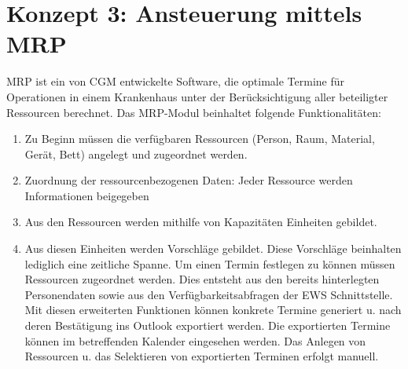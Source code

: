 \section{Konzept 3: Ansteuerung mittels MRP}
MRP ist ein von CGM entwickelte Software, die optimale Termine für Operationen in einem Krankenhaus unter der Berücksichtigung aller beteiligter Ressourcen berechnet. Das MRP-Modul beinhaltet folgende Funktionalitäten:\\
\begin{enumerate}
	\item Zu Beginn müssen die verfügbaren Ressourcen (Person, Raum, Material, Gerät, Bett) angelegt und zugeordnet werden.  
	\item Zuordnung der ressourcenbezogenen Daten: Jeder  Ressource werden Informationen beigegeben
	\item Aus den Ressourcen werden mithilfe von Kapazitäten Einheiten gebildet.
	\item Aus diesen Einheiten werden Vorschläge gebildet. Diese Vorschläge beinhalten lediglich eine zeitliche Spanne. Um einen Termin festlegen zu können müssen Ressourcen zugeordnet werden. Dies entsteht aus den bereits hinterlegten Personendaten sowie aus den Verfügbarkeitsabfragen der EWS Schnittstelle. Mit diesen erweiterten Funktionen können konkrete Termine generiert u. nach deren Bestätigung ins Outlook exportiert werden. Die exportierten Termine können im betreffenden Kalender eingesehen werden. Das Anlegen von Ressourcen u. das Selektieren von exportierten Terminen erfolgt manuell.
\end{enumerate}	


